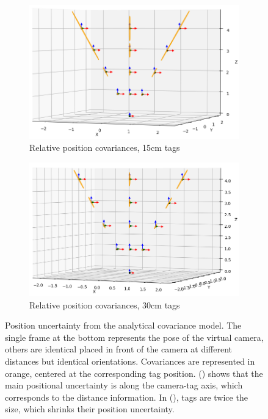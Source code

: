 \begin{figure}[h]
    \centering
    \begin{subfigure}{.50\linewidth}
        \centering
        \includegraphics[width=\textwidth]{figures/apriltag_cov_P_015.png}
        \caption{Relative position covariances, 15cm tags \label{fig:apriltag_cov_P_015}}
    \end{subfigure}%
    \hfill
    \begin{subfigure}{.50\linewidth}
        \centering
        \includegraphics[width=\textwidth]{figures/apriltag_cov_P_030.png}
        \caption{Relative position covariances, 30cm tags \label{fig:apriltag_cov_P_030}}
    \end{subfigure}%
    \caption{Position uncertainty from the analytical covariance model. The single frame at the bottom represents the pose of the virtual camera, others are identical 
    \apriltags placed in front of the camera at different distances but identical orientations. Covariances are represented in orange, centered at the corresponding tag 
    position.
    () shows that the main positional uncertainty is along the camera-tag axis, which corresponds to the distance information. 
    In (), tags are twice the size, which shrinks their position uncertainty.}
    \label{fig:apriltag_cov_P}
\end{figure}

